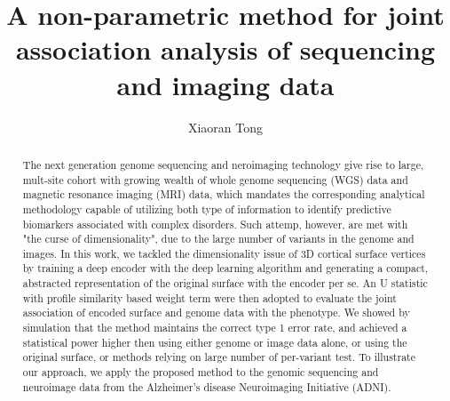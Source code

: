 \documentclass[twocolumn]{article}
\author{Xiaoran Tong}
\begin{document}
\title{A non-parametric method for joint association analysis of sequencing and imaging data}
\maketitle

\begin{abstract}
The next generation genome sequencing and neroimaging technology give rise to large, mult-site cohort with growing wealth of whole genome sequencing (WGS) data and magnetic resonance imaging (MRI) data, which mandates the corresponding analytical methodology capable of utilizing both type of information to identify predictive biomarkers associated with complex disorders. Such attemp, however, are met with "the curse of dimensionality", due to the large number of variants in the genome and images. In this work, we tackled the dimensionality issue of 3D cortical surface vertices by training a deep encoder with the deep learning algorithm and generating a compact, abstracted representation of the original surface with the encoder per se. An U statistic with profile similarity based weight term were then adopted to evaluate the joint association of encoded surface and genome data with the phenotype. We showed by simulation that the method maintains the correct type 1 error rate, and achieved a statistical power higher then using either genome or image data alone, or using the original surface, or methods relying on large number of per-variant test. To illustrate our approach, we apply the proposed method to the genomic sequencing and neuroimage data from the Alzheimer's disease Neuroimaging Initiative (ADNI).
\end{abstract}
\end{document}
